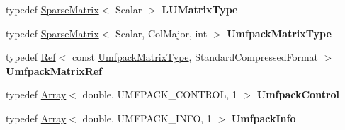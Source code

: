 \begin{DoxyCompactItemize}
\item 
\mbox{\label{class_eigen_1_1_umf_pack_l_u_acc3edb274787854495c951c4e05a9265}} 
typedef \mbox{\hyperlink{class_eigen_1_1_sparse_matrix}{Sparse\+Matrix}}$<$ Scalar $>$ {\bfseries L\+U\+Matrix\+Type}
\item 
\mbox{\label{class_eigen_1_1_umf_pack_l_u_ad00daeabee40de549ce6a03de88ddb33}} 
typedef \mbox{\hyperlink{class_eigen_1_1_sparse_matrix}{Sparse\+Matrix}}$<$ Scalar, Col\+Major, int $>$ {\bfseries Umfpack\+Matrix\+Type}
\item 
\mbox{\label{class_eigen_1_1_umf_pack_l_u_adf053e553c6f76bb02f4402b5f94140a}} 
typedef \mbox{\hyperlink{class_eigen_1_1_ref}{Ref}}$<$ const \mbox{\hyperlink{class_eigen_1_1_sparse_matrix}{Umfpack\+Matrix\+Type}}, Standard\+Compressed\+Format $>$ {\bfseries Umfpack\+Matrix\+Ref}
\item 
\mbox{\label{class_eigen_1_1_umf_pack_l_u_a69a586a34ae369164d464c5551bcce73}} 
typedef \mbox{\hyperlink{class_eigen_1_1_array}{Array}}$<$ double, U\+M\+F\+P\+A\+C\+K\+\_\+\+C\+O\+N\+T\+R\+OL, 1 $>$ {\bfseries Umfpack\+Control}
\item 
\mbox{\label{class_eigen_1_1_umf_pack_l_u_a4d5a177b46684f13e132768f27723382}} 
typedef \mbox{\hyperlink{class_eigen_1_1_array}{Array}}$<$ double, U\+M\+F\+P\+A\+C\+K\+\_\+\+I\+N\+FO, 1 $>$ {\bfseries Umfpack\+Info}
\end{DoxyCompactItemize}
